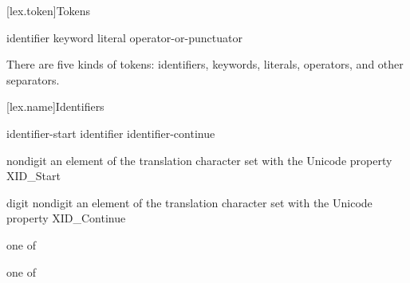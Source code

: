 [lex.token]{Tokens}

%
\begin{bnf}
\br
    identifier\br
    keyword\br
    literal\br
    operator-or-punctuator
\end{bnf}

\pnum
{}%
There are five kinds of tokens: identifiers, keywords, literals,
operators, and other separators.

[lex.name]{Identifiers}
%
%

%
\begin{bnf}
\br
    identifier-start\br
    identifier identifier-continue
\end{bnf}

\begin{bnf}
\br
    nondigit\br
    \textnormal{an element of the translation character set with the Unicode property XID_Start}
\end{bnf}

\begin{bnf}
\br
    digit\br
    nondigit\br
    \textnormal{an element of the translation character set with the Unicode property XID_Continue}
\end{bnf}

\begin{bnf}
 \textnormal{one of}\br
    \br
    \br
    \br
\end{bnf}

\begin{bnf}
 \textnormal{one of}\br
\end{bnf}

